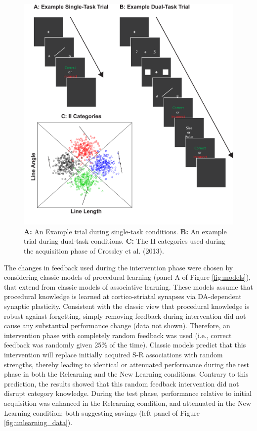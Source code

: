 \begin{figure}[t]
  \centering \includegraphics[width=1.0\textwidth]{../figures/fig_trials.pdf}
  \caption{
    \textbf{A:} An Example trial during single-task conditions.
    \textbf{B:} An example trial during dual-task conditions.
    \textbf{C:} The II categories used during the acquisition phase of
    Crossley et al. (2013).
  }
  \label{fig:test_cats}
\end{figure}

The changes in feedback used during the intervention phase were chosen by
considering classic models of procedural learning (panel A of Figure
\ref{fig:models}), that extend from classic models of associative learning.
These models assume that procedural knowledge is learned at cortico-striatal
synapses via DA-dependent synaptic plasticity. Consistent with the classic view
that procedural knowledge is robust against forgetting, simply removing feedback
during intervention did not cause any substantial performance change (data not
shown). Therefore, an intervention phase with completely random feedback was
used (i.e., correct feedback was randomly given 25\% of the time). Classic
models predict that this intervention will replace initially acquired S-R
associations with random strengths, thereby leading to identical or attenuated
performance during the test phase in both the Relearning and the New Learning
conditions. Contrary to this prediction, the results showed that this random
feedback intervention did not disrupt category knowledge. During the test phase,
performance relative to initial acquisition was enhanced in the Relearning
condition, and attenuated in the New Learning condition; both suggesting savings
(left panel of Figure \ref{fig:unlearning_data}).

